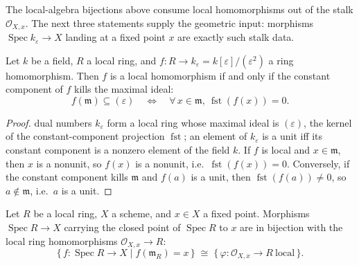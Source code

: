 The local-algebra bijections above consume local homomorphisms out of
the stalk \(\mathcal O_{X,x}\). The next three statements supply the
geometric input: morphisms \(\operatorname{Spec} k_\varepsilon \to X\)
landing at a fixed point \(x\) are exactly such stalk data.

\begin{lemma}\label{mk-lem:tangent_dual_number_local_iff}
  \leanok

  Let \(k\) be a field, \(R\) a local ring, and
  \(f : R \to k_\varepsilon = k[\varepsilon]/(\varepsilon^2)\) a ring
  homomorphism. Then \(f\) is a local homomorphism if and only if the
  constant component of \(f\) kills the maximal ideal:
  \[
    f(\mathfrak m) \subseteq (\varepsilon)
    \quad\Longleftrightarrow\quad
    \forall\, x \in \mathfrak m,\ \operatorname{fst}(f(x)) = 0 .
  \]
\end{lemma}

\begin{proof}
  \leanokThe dual numbers \(k_\varepsilon\) form a local ring whose maximal
  ideal is \((\varepsilon)\), the kernel of the constant-component
  projection \(\operatorname{fst}\); an element of
  \(k_\varepsilon\) is a unit iff its constant component is a nonzero
  element of the field \(k\). If \(f\) is local and
  \(x \in \mathfrak m\), then \(x\) is a nonunit, so \(f(x)\) is a
  nonunit, i.e.\ \(\operatorname{fst}(f(x)) = 0\). Conversely, if the
  constant component kills \(\mathfrak m\) and \(f(a)\) is a unit,
  then \(\operatorname{fst}(f(a)) \neq 0\), so \(a \notin \mathfrak m\),
  i.e.\ \(a\) is a unit.
\end{proof}

\begin{lemma}\label{mk-lem:tangent_spec_local_ring_at}
  \leanok

  Let \(R\) be a local ring, \(X\) a scheme, and \(x \in X\) a fixed
  point. Morphisms \(\operatorname{Spec} R \to X\) carrying the closed
  point of \(\operatorname{Spec} R\) to \(x\) are in bijection with the
  local ring homomorphisms \(\mathcal O_{X,x} \to R\):
  \[
    \{\, f : \operatorname{Spec} R \to X \mid f(\mathfrak m_R) = x \,\}
    \;\cong\;
    \{\, \varphi : \mathcal O_{X,x} \to R \ \text{local} \,\}.
  \]
\end{lemma}

